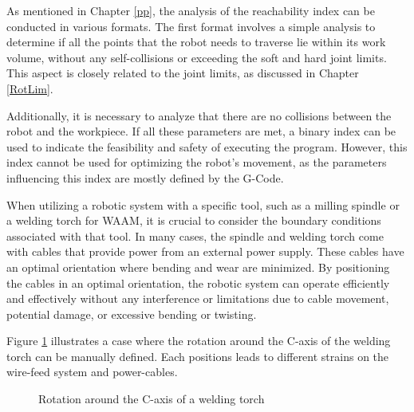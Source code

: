As mentioned in Chapter \ref{pp}, the analysis of the reachability index can be conducted in various formats. The first format involves a simple analysis to determine if all the points that the robot needs to traverse lie within its work volume, without any self-collisions or exceeding the soft and hard joint limits. This aspect is closely related to the joint limits, as discussed in Chapter \ref{RotLim}. 

Additionally, it is necessary to analyze that there are no collisions between the robot and the workpiece. If all these parameters are met, a binary index can be used to indicate the feasibility and safety of executing the program. However, this index cannot be used for optimizing the robot's movement, as the parameters influencing this index are mostly defined by the G-Code.

When utilizing a robotic system with a specific tool, such as a milling spindle or a welding torch for WAAM, it is crucial to consider the boundary conditions associated with that tool. In many cases, the spindle and welding torch come with cables that provide power from an external power supply. These cables have an optimal orientation where bending and wear are minimized. By positioning the cables in an optimal orientation, the robotic system can operate efficiently and effectively without any interference or limitations due to cable movement, potential damage, or excessive bending or twisting.

Figure \ref{rot} illustrates a case where the rotation around the C-axis of the welding torch can be manually defined. Each positions leads to different strains on the wire-feed system and power-cables.

\begin{figure}[H]%
	\centering
	\qquad
	\caption{Rotation around the C-axis of a welding torch }%
	\label{rot}%
\end{figure}


